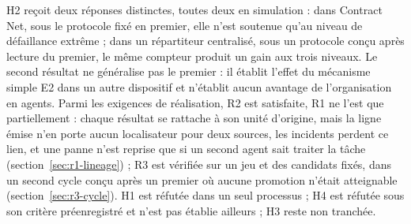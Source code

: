 H2 reçoit deux réponses distinctes, toutes deux en simulation : dans Contract Net, sous le protocole fixé en premier, elle n'est soutenue qu'au niveau de défaillance extrême ; dans un répartiteur centralisé, sous un protocole conçu après lecture du premier, le même compteur produit un gain aux trois niveaux. Le second résultat ne généralise pas le premier : il établit l'effet du mécanisme simple E2 dans un autre dispositif et n'établit aucun avantage de l'organisation en agents. Parmi les exigences de réalisation, R2 est satisfaite, R1 ne l'est que partiellement : chaque résultat se rattache à son unité d'origine, mais la ligne émise n'en porte aucun localisateur pour deux sources, les incidents perdent ce lien, et une panne n'est reprise que si un second agent sait traiter la tâche (section~\ref{sec:r1-lineage}) ; R3 est vérifiée sur un jeu et des candidats fixés, dans un second cycle conçu après un premier où aucune promotion n'était atteignable (section~\ref{sec:r3-cycle}). H1 est réfutée dans un seul processus ; H4 est réfutée sous son critère préenregistré et n'est pas établie ailleurs ; H3 reste non tranchée.

